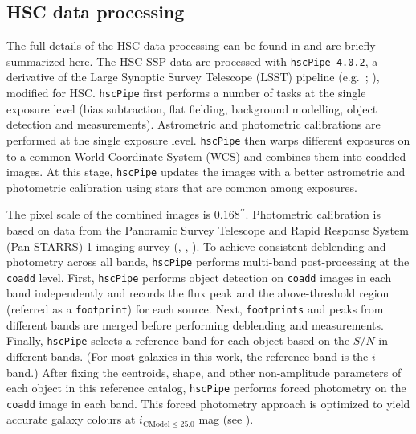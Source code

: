 \documentclass[fleqn,usenatbib]{mnras}
\def\asec{$^{\prime\prime}$}
\begin{document}
\subsection{HSC data processing} 
    \label{sec:pipeline}

    The full details of the HSC data processing can be found in \citet{HSC-PIPE}
    and are briefly summarized here. 
    The HSC SSP data are processed with \texttt{hscPipe 4.0.2}, a derivative of the 
    Large Synoptic Survey Telescope (LSST) pipeline (e.g.\ \citealt{Juric2015}; 
    \citealt{Axelrod2010}), modified for HSC. 
    \texttt{hscPipe} first performs a number of tasks at the single exposure level 
    (bias subtraction, flat fielding, background modelling, object detection and 
    measurements). 
    Astrometric and photometric calibrations are performed at the single exposure 
    level. 
    \texttt{hscPipe} then warps different exposures on to a common World Coordinate 
    System (WCS) and combines them into coadded images. 
    At this stage, \texttt{hscPipe} updates the images with a better astrometric and 
    photometric calibration using stars that are common among exposures. 
    
    The pixel scale of the combined images is $0.168$\asec{}. 
    Photometric calibration is based on data from the Panoramic Survey Telescope 
    and Rapid Response System (Pan-STARRS) 1 imaging survey 
    (\citealt{Schlafly2012}, \citealt{Tonry2012}, \citealt{Magnier2013}). 
    To achieve consistent deblending and photometry across all bands, \texttt{hscPipe} 
    performs multi-band post-processing at the \texttt{coadd} level. 
    First, \texttt{hscPipe} performs object detection on \texttt{coadd} images in 
    each band independently and records the flux peak and the above-threshold region 
    (referred as a \texttt{footprint}) for each source. 
    Next, \texttt{footprints} and peaks from different bands are merged before     
    performing deblending and measurements. 
    Finally, \texttt{hscPipe} selects a reference band for each object based on the 
    $S/N$ in different bands. (For most galaxies in this work, the reference band is 
    the $i$-band.) 
    After fixing the centroids, shape, and other non-amplitude parameters of each 
    object in this reference catalog, \texttt{hscPipe} performs forced photometry 
    on the \texttt{coadd} image in each band.
    This forced photometry approach is optimized to yield accurate galaxy colours
    at $i_{\mathrm{CModel}\leq25.0}$ mag (see \citealt{SynPipe}).
       
\end{document}
